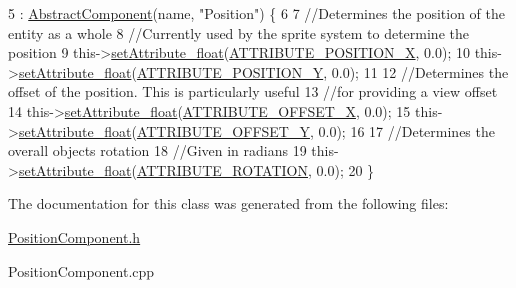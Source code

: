 \begin{DoxyCode}
5     : \hyperlink{class_abstract_component_ab08b845eddbdbe411b95a5385501ab97}{AbstractComponent}(name, \textcolor{stringliteral}{"Position"}) \{
6 
7     \textcolor{comment}{//Determines the position of the entity as a whole}
8         \textcolor{comment}{//Currently used by the sprite system to determine the position}
9     this->\hyperlink{class_abstract_component_aadaf9dfbb371db5fb21f9c7cf2cbea98}{setAttribute\_float}(\hyperlink{_a_e___attributes_8h_af6d494c0177e73da9ce2c06e77d8ca03}{ATTRIBUTE\_POSITION\_X}, 0.0);
10     this->\hyperlink{class_abstract_component_aadaf9dfbb371db5fb21f9c7cf2cbea98}{setAttribute\_float}(\hyperlink{_a_e___attributes_8h_a38e831ab6c249750393e3007fa035507}{ATTRIBUTE\_POSITION\_Y}, 0.0);
11 
12     \textcolor{comment}{//Determines the offset of the position. This is particularly useful}
13         \textcolor{comment}{//for providing a view offset}
14     this->\hyperlink{class_abstract_component_aadaf9dfbb371db5fb21f9c7cf2cbea98}{setAttribute\_float}(\hyperlink{_a_e___attributes_8h_aa003b6ad3f43053c9d43e1acc0098691}{ATTRIBUTE\_OFFSET\_X}, 0.0);
15     this->\hyperlink{class_abstract_component_aadaf9dfbb371db5fb21f9c7cf2cbea98}{setAttribute\_float}(\hyperlink{_a_e___attributes_8h_a8ebf91b8ee9dfdfad18bc10c3c42d564}{ATTRIBUTE\_OFFSET\_Y}, 0.0);
16 
17     \textcolor{comment}{//Determines the overall objects rotation}
18         \textcolor{comment}{//Given in radians}
19     this->\hyperlink{class_abstract_component_aadaf9dfbb371db5fb21f9c7cf2cbea98}{setAttribute\_float}(\hyperlink{_a_e___attributes_8h_a70254d936ce8b3662e1a7472c36832d5}{ATTRIBUTE\_ROTATION}, 0.0);
20 \}
\end{DoxyCode}


The documentation for this class was generated from the following files\-:\begin{DoxyCompactItemize}
\item 
\hyperlink{_position_component_8h}{Position\-Component.\-h}\item 
Position\-Component.\-cpp\end{DoxyCompactItemize}
